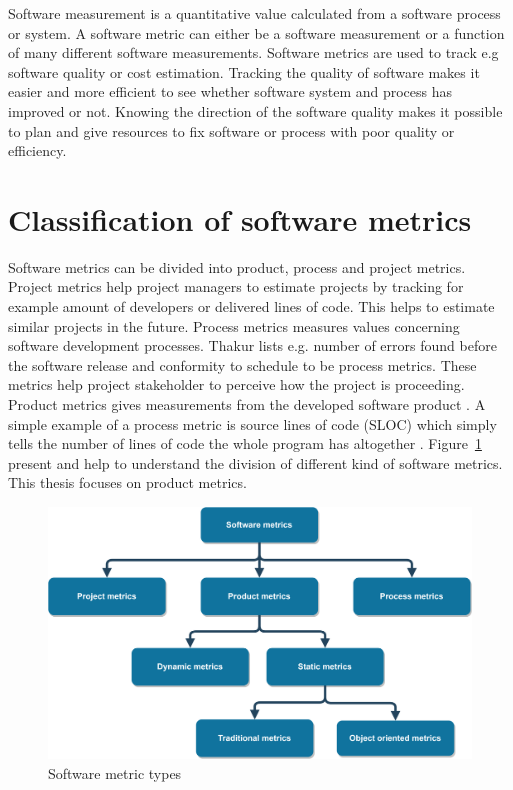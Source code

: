 Software measurement is a quantitative value calculated from a software process or system. A software metric can either be a software measurement or a function of many different software measurements. Software metrics are used to track e.g software quality or cost estimation. Tracking the quality of software makes it easier and more efficient to see whether software system and process has improved or not. Knowing the direction of the software quality makes it possible to plan and give resources to fix software or process with poor quality or efficiency. 

\section{Classification of software metrics}

Software metrics can be divided into product, process and project metrics. Project metrics \cite{dineshthakur} help project managers to estimate projects by tracking for example amount of developers or delivered lines of code. This helps to estimate similar projects in the future. Process metrics measures values concerning software development processes. Thakur lists e.g. number of errors found before the software release and conformity to schedule to be process metrics. These metrics help project stakeholder to perceive how the project is proceeding.
Product metrics gives measurements from the developed software product \cite{sommerville2011software}.  A simple example of a process metric is source lines of code (SLOC) which simply tells the number of lines of code the whole program has altogether \cite{nguyen2007sloc}. Figure~\ref{fig:metrictree} present and help to understand the division of different kind of software metrics. This thesis focuses on product metrics. 

\begin{figure}[t!]
\centering
\includegraphics[scale=0.05]{metrictree.png}
\caption{Software metric types}
\label{fig:metrictree}
\end{figure}

